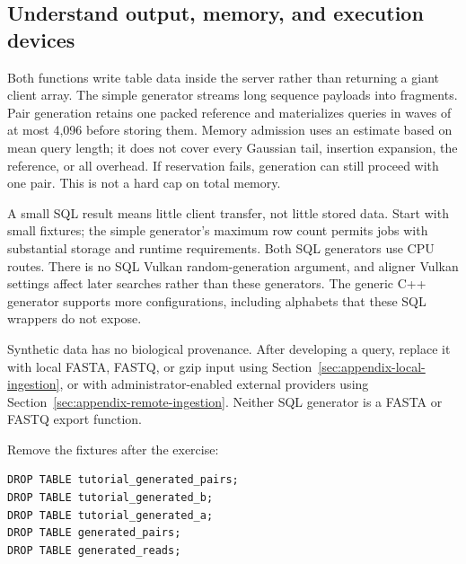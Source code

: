 \subsection{Understand output, memory, and execution devices}

Both functions write table data inside the server rather than returning a
giant client array. The simple generator streams long sequence payloads into
fragments. Pair generation retains one packed reference and materializes
queries in waves of at most 4,096 before storing them. Memory admission uses
an estimate based on mean query length; it does not cover every Gaussian
tail, insertion expansion, the reference, or all overhead. If reservation
fails, generation can still proceed with one pair. This is not a hard cap on
total memory.

A small SQL result means little client transfer, not little stored data.
Start with small fixtures; the simple generator's maximum row count permits
jobs with substantial storage and runtime requirements. Both SQL generators
use CPU routes. There is no SQL Vulkan random-generation argument, and
aligner Vulkan settings affect later searches rather than these generators.
The generic C++ generator supports more configurations, including alphabets
that these SQL wrappers do not expose.

Synthetic data has no biological provenance. After developing a query,
replace it with local FASTA, FASTQ, or gzip input using
Section~\ref{sec:appendix-local-ingestion}, or with administrator-enabled
external providers using Section~\ref{sec:appendix-remote-ingestion}. Neither SQL
generator is a FASTA or FASTQ export function.

Remove the fixtures after the exercise:
\par\noindent\begin{minipage}{\linewidth}
\begin{lstlisting}[style=bioseq-appendix-sql]
DROP TABLE tutorial_generated_pairs;
DROP TABLE tutorial_generated_b;
DROP TABLE tutorial_generated_a;
DROP TABLE generated_pairs;
DROP TABLE generated_reads;
\end{lstlisting}
\end{minipage}

